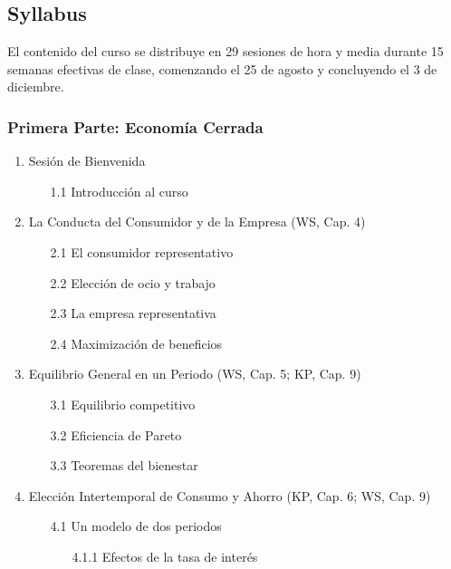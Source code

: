 \documentclass[12pt]{article}
\begin{document}
\newpage

\subsection*{Syllabus}

\noindent El contenido del curso se distribuye en 29 sesiones de hora y media durante 15 semanas efectivas de clase, comenzando el 25 de agosto y concluyendo el 3 de diciembre. 

\vspace{0.1cm}


\subsubsection*{Primera Parte: Economía Cerrada}
 \begin{enumerate}
     \item Sesión de Bienvenida
     \begin{enumerate}
         \item[1.1] Introducción al curso
     \end{enumerate}
     \item La Conducta del Consumidor y de la Empresa (WS, Cap. 4)
     \begin{enumerate}
        \item[2.1] El consumidor representativo
        \item[2.2] Elección de ocio y trabajo
        \item[2.3] La empresa representativa
        \item[2.4] Maximización de beneficios
     \end{enumerate}
     \item Equilibrio General en un Periodo (WS, Cap. 5; KP, Cap. 9)
     \begin{enumerate}
         \item[3.1] Equilibrio competitivo
         \item[3.2] Eficiencia de Pareto 
         \item[3.3] Teoremas del bienestar 
     \end{enumerate}
     \item Elección Intertemporal de Consumo y Ahorro (KP, Cap. 6; WS, Cap. 9)
     \begin{enumerate}
         \item[4.1] Un modelo de dos periodos
         \begin{enumerate}
             \item[4.1.1] Efectos de la tasa de interés

\end{enumerate}
\end{enumerate}
\end{enumerate}
\end{document}
